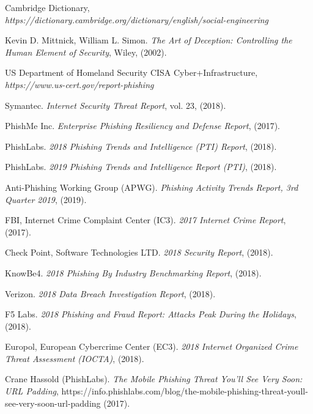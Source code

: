 \documentclass[a4paper]{article}
\begin{document}
\newpage
\begin{thebibliography}{1}

\vspace{5mm}


Cambridge Dictionary, \textit{https://dictionary.cambridge.org/dictionary/english/social-engineering}

Kevin D. Mittnick, William L. Simon. \emph{The Art of Deception: Controlling the Human Element of Security}, Wiley, (2002).

US Department of Homeland Security CISA Cyber+Infrastructure,
\textit{https://www.us-cert.gov/report-phishing}


Symantec. \emph{Internet Security Threat Report}, vol. 23, (2018).

PhishMe Inc. \emph{Enterprise Phishing Resiliency and Defense Report}, (2017).

PhishLabs. \emph{2018 Phishing Trends and Intelligence (PTI) Report}, (2018).

PhishLabs. \emph{2019 Phishing Trends and Intelligence Report (PTI)}, (2018).

Anti-Phishing Working Group (APWG). \emph{Phishing Activity Trends Report, 3rd Quarter 2019}, (2019).

FBI, Internet Crime Complaint Center (IC3). \emph{2017 Internet Crime Report}, (2017).

Check Point, Software Technologies LTD. \emph{2018 Security Report}, (2018).

KnowBe4. \emph{2018 Phishing By Industry Benchmarking Report}, (2018).

Verizon. \emph{2018 Data Breach Investigation Report}, (2018).

F5 Labs. \emph{2018 Phishing and Fraud Report: Attacks Peak During the Holidays}, (2018).

Europol, European Cybercrime Center (EC3). \emph{2018 Internet Organized Crime Threat Assessment (IOCTA)}, (2018).


Crane Hassold (PhishLabs). \emph{The Mobile Phishing Threat You’ll See Very Soon: URL Padding}, https://info.phishlabs.com/blog/the-mobile-phishing-threat-youll-see-very-soon-url-padding (2017).


\end{thebibliography}
\end{document}
